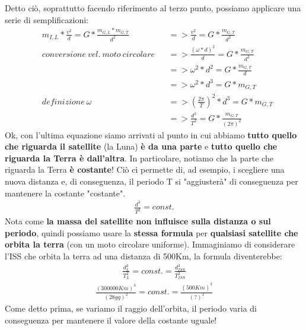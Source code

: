         Detto ciò, soprattutto facendo riferimento al terzo punto, possiamo applicare una serie di semplificazioni:
        \begin{align*}
            &m_{I,L}*\frac{v^2}{d} = G*\frac{m_{G,L}*m_{G,T}}{d^2} && => \frac{v^2}{d} = G*\frac{m_{G,T}}{d^2}\\
            &conversione\ vel.\ moto\ circolare &&=>\frac{(\omega*d)^2}{d}=G*\frac{m_{G, T}}{d^2}\\
            & &&=>\omega^2*d^2=G*\frac{m_{G, T}}{d}\\
            & &&=>\omega^2*d^3=G*m_{G, T}\\
            &definizione\ \omega &&=>(\frac{2\pi}{T})^2*d^3=G*m_{G, T}\\
            & &&=> \frac{d^3}{T^2} = G*\frac{m_{G, T}}{(2\pi)^2}
        \end{align*}
        Ok, con l'ultima equazione siamo arrivati al punto in cui abbiamo \textbf{tutto quello che riguarda il satellite} (la Luna) \textbf{è da una parte} e \textbf{tutto quello che riguarda la Terra è dall'altra}. In particolare, notiamo che la parte che riguarda la Terra \textbf{è costante}! Ciò ci permette di, ad esempio, i scegliere una nuova distanza e, di conseguenza, il periodo T si "aggiusterà" di conseguenza per mantenere la costante "costante".
        \begin{align*}
            \frac{d^3}{T^2} = const.
        \end{align*}
        Nota come \textbf{la massa del satellite non influisce sulla distanza o sul periodo}, quindi possiamo usare la \textbf{stessa formula} per \textbf{qualsiasi satellite che orbita la terra} (con un moto circolare uniforme). Immaginiamo di considerare l'ISS che orbita la terra ad una distanza di 500Km, la formula diventerebbe:
        \begin{align*}
            \frac{d_L^3}{T_L^2} = const. = \frac{d_{ISS}^3}{T_{ISS}^2}
        \end{align*}
        \begin{align*}
            \frac{(300000Km)^3}{(28gg)^2} = const. = \frac{(500Km)^3}{(?)^2}
        \end{align*}
        Come detto prima, se variamo il raggio dell'orbita, il periodo varia di conseguenza per mantenere il valore della costante uguale!

